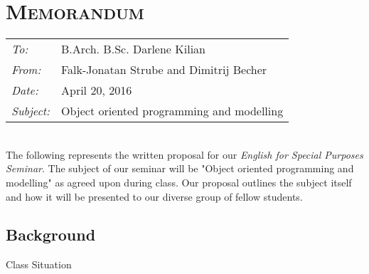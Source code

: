 
\renewcommand{\workingdir}{../../}



\DNotiz{}
\renewcommand{\Dokumentensignatur}{}




\chapter*{\textsc{Memorandum}}
\begin{tabular}{l l}
\emph{To:} & B.Arch. B.Sc. Darlene Kilian\\
\emph{From:} & Falk-Jonatan Strube and Dimitrij Becher\\
\emph{Date:} & April 20, 2016\\
\emph{Subject:} & Object oriented programming and modelling\\
\end{tabular}\medskip\\
The following represents the written proposal for our \emph{English for Special Purposes Seminar}. The subject of our seminar will be "Object oriented programming and modelling" as agreed upon during class. Our proposal outlines the subject itself and how it will be presented to our diverse group of fellow students. 

\section*{Background}
Class Situation

